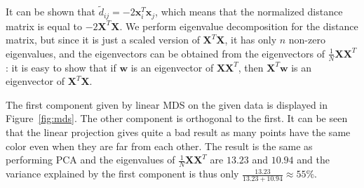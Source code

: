 \documentclass{article}
\renewcommand\vec[1]{\ensuremath{\mathbf{#1}}}
\begin{document}
It can be shown that $\tilde{d}_{ij} = -2\vec x_i^T\vec x_j$, which means that the normalized distance matrix is equal to $-2\vec X^T\vec X$.
We perform eigenvalue decomposition for the distance matrix, but since it is just a scaled version of $\vec X^T\vec X$, it has only $n$ non-zero eigenvalues, and the eigenvectors can be obtained from the eigenvectors of $\frac{1}{N}\vec X\vec X^T$: it is easy to show that if $\vec w$ is an eigenvector of $\vec X\vec X^T$, then $\vec X^T\vec w$ is an eigenvector of $\vec X^T\vec X$.

The first component given by linear MDS on the given data is displayed in Figure~\ref{fig:mds}.
The other component is orthogonal to the first.
It can be seen that the linear projection gives quite a bad result as many points have the same color even when they are far from each other.
The result is the same as performing PCA and the eigenvalues of $\frac{1}{N}\vec X\vec X^T$ are $13.23$ and $10.94$ and the variance explained by the first component is thus only $\frac{13.23}{13.23+10.94}\approx 55\%$.
\end{document}
